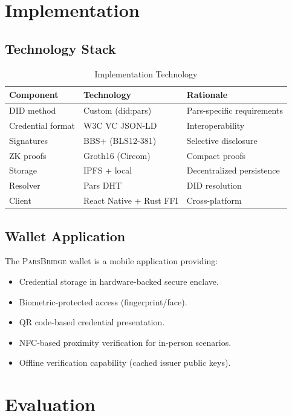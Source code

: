\documentclass[11pt,a4paper]{article}
\newcommand{\bridge}{\textsc{ParsBridge}\xspace}
\begin{document}
\section{Implementation}

\subsection{Technology Stack}

\begin{table}[H]
\centering
\caption{Implementation Technology}
\label{tab:tech}
\begin{tabular}{lll}
\toprule
\textbf{Component} & \textbf{Technology} & \textbf{Rationale} \\
\midrule
DID method & Custom (did:pars) & Pars-specific requirements \\
Credential format & W3C VC JSON-LD & Interoperability \\
Signatures & BBS+ (BLS12-381) & Selective disclosure \\
ZK proofs & Groth16 (Circom) & Compact proofs \\
Storage & IPFS + local & Decentralized persistence \\
Resolver & Pars DHT & DID resolution \\
Client & React Native + Rust FFI & Cross-platform \\
\bottomrule
\end{tabular}
\end{table}

\subsection{Wallet Application}

The \bridge wallet is a mobile application providing:

\begin{itemize}
    \item Credential storage in hardware-backed secure enclave.
    \item Biometric-protected access (fingerprint/face).
    \item QR code-based credential presentation.
    \item NFC-based proximity verification for in-person scenarios.
    \item Offline verification capability (cached issuer public keys).
\end{itemize}

\section{Evaluation}
\end{document}
